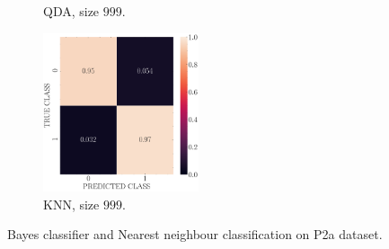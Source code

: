 \documentclass[12pt, a4 paper]{article}
\begin{document}
\begin{figure}[!htbp]
\begin{subfigure}[!htbp]{0.24\textwidth}
       \caption{QDA, size $999$.}
       \label{fig:QDA_rr20_P2a_999}
    \end{subfigure}
\quad \quad
    \begin{subfigure}[!htbp]{0.24\textwidth}
       \centering
       \includegraphics[width=1.8in]{../results/ex2/conf_mtx_KNN_dataset_P2a_size_999.pdf}
       \caption{KNN, size $999$.}
       \label{fig:KNN_rr20_P2a_999}
    \end{subfigure}
\caption{Bayes classifier and Nearest neighbour classification on P2a dataset.}
\label{fig:ex2P2a}
\end{figure}
\end{document}

